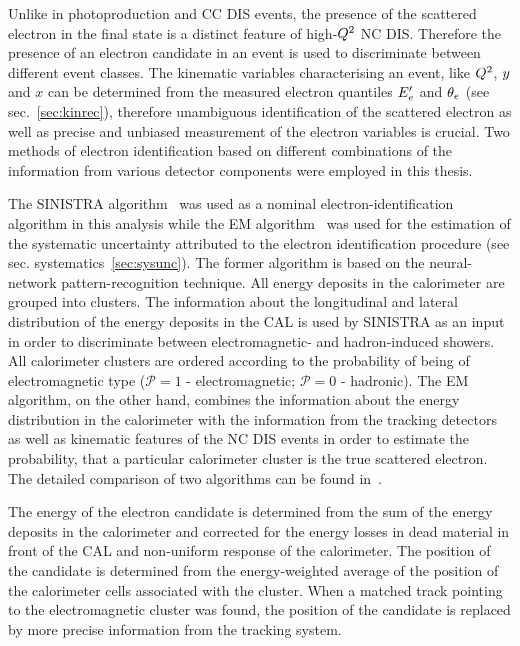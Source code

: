Unlike in photoproduction and CC DIS events, the presence of the scattered electron in the final state is a distinct feature of high-$\mbox{${Q^2}$}$ NC DIS. Therefore the presence of an electron candidate in an event is used to discriminate between different event classes. The kinematic variables characterising an event, like $\mbox{${Q^2}$}$, $\mbox{${y}$}$ and $x$ can be determined from the measured electron quantiles $\mbox{$E_e'$}$ and $\mbox{$\theta_e$}$ (see sec.~\ref{sec:kinrec}), therefore unambiguous identification of the scattered electron as well as precise and unbiased measurement of the electron variables is crucial. Two methods of electron identification based on different combinations of the information from various detector components were employed in this thesis. 

The SINISTRA algorithm~\cite{nim:a365:508} was used as a nominal electron-identification algorithm in this analysis while the EM algorithm~\cite{epj:c11:427,upub:Straub:url} was used for the estimation of the systematic uncertainty attributed to the electron identification procedure (see sec. systematics~\ref{sec:sysunc}). The former algorithm is based on the neural-network pattern-recognition technique. All energy deposits in the calorimeter are grouped into clusters. The information about the longitudinal and lateral distribution of the energy deposits in the CAL is used by SINISTRA as an input in order to discriminate between electromagnetic- and hadron-induced showers. All calorimeter clusters are ordered according to the probability of being of electromagnetic type (${\mathcal P}=1$ - electromagnetic; ${\mathcal P=0}$ - hadronic). The EM algorithm, on the other hand, combines the information about the energy distribution in the calorimeter with the information from the tracking detectors as well as kinematic features of the NC DIS events in order to estimate the probability, that a particular calorimeter cluster is the true scattered electron. The detailed comparison of two algorithms can be found in~\cite{upub:schlenstedt:zn9977}.

The energy of the electron candidate is determined from the sum of the energy deposits in the calorimeter and corrected for the energy losses in dead material in front of the CAL and non-uniform response of the calorimeter. The position of the candidate is determined from the energy-weighted average of the position of the calorimeter cells associated with the cluster. When a matched track pointing to the electromagnetic cluster was found, the position of the candidate is replaced by more precise information from the tracking system.
